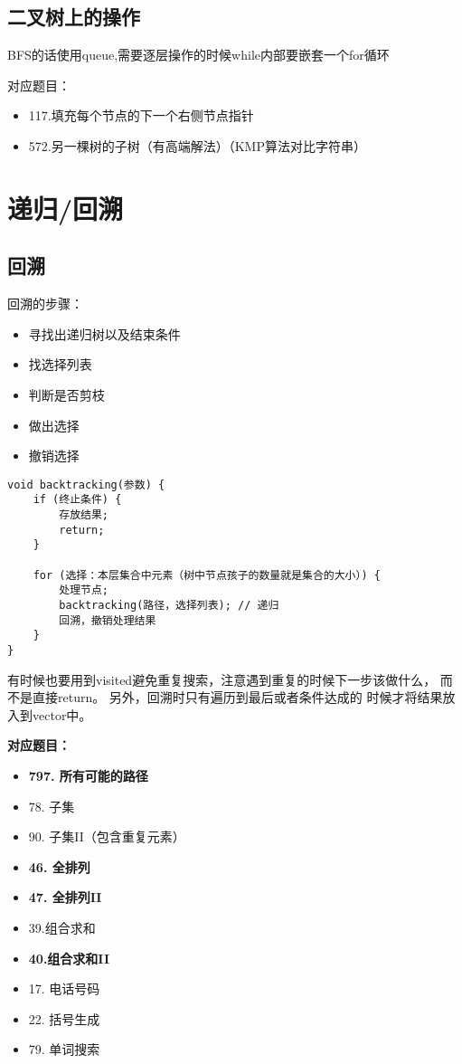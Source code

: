 \documentclass[a4paper,twoside]{ctexart}
\begin{document}
\subsection{二叉树上的操作}

BFS的话使用queue,需要逐层操作的时候while内部要嵌套一个for循环

对应题目：
\begin{itemize}
\item 117.填充每个节点的下一个右侧节点指针
\item 572.另一棵树的子树（有高端解法）（KMP算法对比字符串）
\end{itemize}

\section{递归/回溯}

\subsection{回溯}

回溯的步骤：
\begin{itemize}
\item 寻找出递归树以及结束条件
\item 找选择列表
\item 判断是否剪枝
\item 做出选择
\item 撤销选择
\end{itemize}

\begin{verbatim}
void backtracking(参数) {
    if (终止条件) {
        存放结果;
        return;
    }

    for (选择：本层集合中元素（树中节点孩子的数量就是集合的大小）) {
        处理节点;
        backtracking(路径，选择列表); // 递归
        回溯，撤销处理结果
    }
}

\end{verbatim}

有时候也要用到visited避免重复搜索，注意遇到重复的时候下一步该做什么，
而不是直接return。 另外，回溯时只有遍历到最后或者条件达成的
时候才将结果放入到vector中。

\textbf{对应题目：}
\begin{itemize}
\item \textbf{797. 所有可能的路径}
\item 78. 子集
\item 90. 子集II（包含重复元素）
\item \textbf{46. 全排列}
\item \textbf{47. 全排列II}
\item 39.组合求和
\item \textbf{40.组合求和II}
\item 17. 电话号码
\item 22. 括号生成
\item 79. 单词搜索
\end{itemize}
\end{document}
